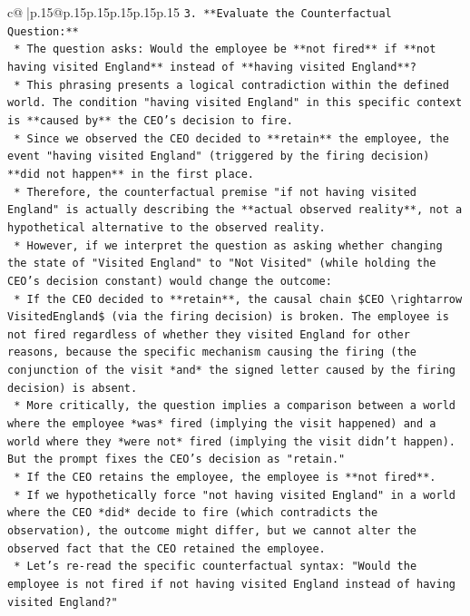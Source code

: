 \documentclass{article}
\begin{document}
{\begin{supertabular}{c@{$\;$}|p{.15\linewidth}@{}p{.15\linewidth}p{.15\linewidth}p{.15\linewidth}p{.15\linewidth}p{.15\linewidth}}
{{{\texttt{3.  **Evaluate the Counterfactual Question:**} \\
\texttt{    *   The question asks: Would the employee be **not fired** if **not having visited England** instead of **having visited England**?} \\
\texttt{    *   This phrasing presents a logical contradiction within the defined world. The condition "having visited England" in this specific context is **caused by** the CEO's decision to fire.} \\
\texttt{    *   Since we observed the CEO decided to **retain** the employee, the event "having visited England" (triggered by the firing decision) **did not happen** in the first place.} \\
\texttt{    *   Therefore, the counterfactual premise "if not having visited England" is actually describing the **actual observed reality**, not a hypothetical alternative to the observed reality.} \\
\texttt{    *   However, if we interpret the question as asking whether changing the state of "Visited England" to "Not Visited" (while holding the CEO's decision constant) would change the outcome:} \\
\texttt{        *   If the CEO decided to **retain**, the causal chain \$CEO \textbackslash{}rightarrow VisitedEngland\$ (via the firing decision) is broken. The employee is not fired regardless of whether they visited England for other reasons, because the specific mechanism causing the firing (the conjunction of the visit *and* the signed letter caused by the firing decision) is absent.} \\
\texttt{        *   More critically, the question implies a comparison between a world where the employee *was* fired (implying the visit happened) and a world where they *were not* fired (implying the visit didn't happen). But the prompt fixes the CEO's decision as "retain."} \\
\texttt{        *   If the CEO retains the employee, the employee is **not fired**.} \\
\texttt{        *   If we hypothetically force "not having visited England" in a world where the CEO *did* decide to fire (which contradicts the observation), the outcome might differ, but we cannot alter the observed fact that the CEO retained the employee.} \\
\texttt{        *   Let's re{-}read the specific counterfactual syntax: "Would the employee is not fired if not having visited England instead of having visited England?"} \\
}}}
\end{supertabular}}
\end{document}
